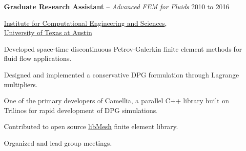 \documentclass[10pt]{article}
\newenvironment{innerlist}[1][\enskip\textbullet]%
        {\begin{compactitem}[#1]}{\end{compactitem}}
\begin{document}
\textbf{Graduate Research Assistant} -- \emph{Advanced FEM for Fluids} \hfill {2010 to 2016}
\begin{innerlist}

\item[] \href{http://ices.utexas.edu/}{Institute for Computational Engineering
and Sciences},\\
        \href{http://www.utexas.edu/}{University of Texas at Austin}
\begin{innerlist}
\item Developed space-time discontinuous Petrov-Galerkin finite element methods for
fluid flow applications.
\item Designed and implemented a conservative DPG formulation through Lagrange multipliers.
\item One of the primary developers of
\href{https://github.com/CamelliaDPG/Camellia}{Camellia}, a parallel C++ library built on Trilinos for
rapid development of DPG simulations.
\item Contributed to open source \href{http://libmesh.github.io/}{libMesh} finite element library.
\item Organized and lead group meetings.
\end{innerlist}
\end{innerlist}

\bigskip
\pagebreak
\end{document}
